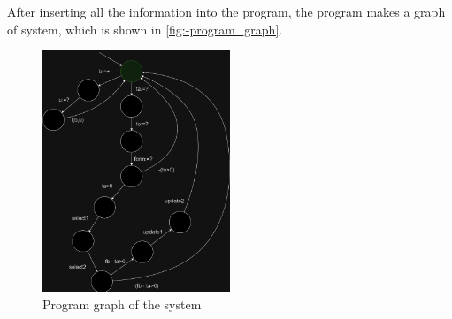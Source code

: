 After inserting all the information into the program, the program makes a graph of system, which is shown in \autoref{fig:-program_graph}.

\begin{figure}[htb!]
    \centering
    \includegraphics[width=0.5\textwidth]{figures/program_graph.png}
    \caption{Program graph of the system}
    \label{fig:-program_graph}
\end{figure}
